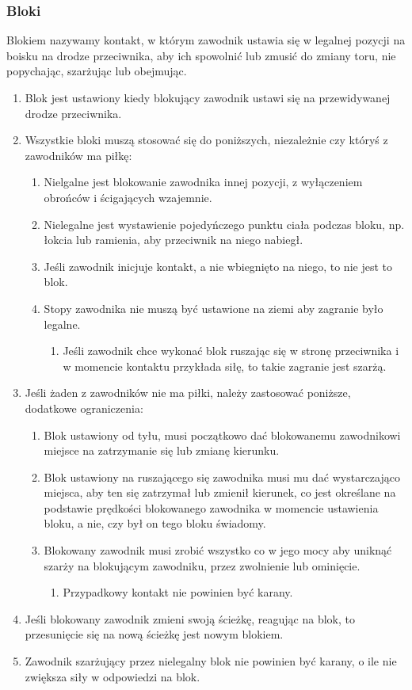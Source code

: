 \documentclass[11pt,a4paper]{article}
\begin{document}
\subsubsection{Bloki}
Blokiem nazywamy kontakt, w którym zawodnik ustawia się w legalnej pozycji na boisku na drodze przeciwnika, aby ich spowolnić lub zmusić do zmiany toru, nie popychając, szarżując lub obejmując.
\begin{enumerate}
  \item Blok jest ustawiony kiedy blokujący zawodnik ustawi się na przewidywanej drodze przeciwnika.
  \item Wszystkie bloki muszą stosować się do poniższych, niezależnie czy któryś z zawodników ma piłkę:
  \begin{enumerate}
    \item Nielgalne jest blokowanie zawodnika innej pozycji, z wyłączeniem obrońców i ścigających wzajemnie.
    \item Nielegalne jest wystawienie pojedyńczego punktu ciała podczas bloku, np. łokcia lub ramienia, aby przeciwnik na niego nabiegł.
    \item Jeśli zawodnik inicjuje kontakt, a nie wbiegnięto na niego, to nie jest to blok.
    \item Stopy zawodnika nie muszą być ustawione na ziemi aby zagranie było legalne.
    \begin{enumerate}
      \item Jeśli zawodnik chce wykonać blok ruszając się w stronę przeciwnika i w momencie kontaktu przykłada siłę, to takie zagranie jest szarżą.
    \end{enumerate}
  \end{enumerate}
  \item Jeśli żaden z zawodników nie ma piłki, należy zastosować poniższe, dodatkowe ograniczenia:
  \begin{enumerate}
    \item Blok ustawiony od tyłu, musi początkowo dać blokowanemu zawodnikowi miejsce na zatrzymanie się lub zmianę kierunku.
    \item Blok ustawiony na ruszającego się zawodnika musi mu dać wystarczająco miejsca, aby ten się zatrzymał lub zmienił kierunek, co jest określane na podstawie prędkości blokowanego zawodnika w momencie ustawienia bloku, a nie, czy był on tego bloku świadomy.
    \item Blokowany zawodnik musi zrobić wszystko co w jego mocy aby uniknąć szarży na blokującym zawodniku, przez zwolnienie lub ominięcie.
    \begin{enumerate}
      \item Przypadkowy kontakt nie powinien być karany.
    \end{enumerate}
  \end{enumerate}
  \item Jeśli blokowany zawodnik zmieni swoją ścieżkę, reagując na blok, to przesunięcie się na nową ścieżkę jest nowym blokiem.
  \item Zawodnik szarżujący przez nielegalny blok nie powinien być karany, o ile nie zwiększa siły w odpowiedzi na blok.
\end{enumerate}
\end{document}
